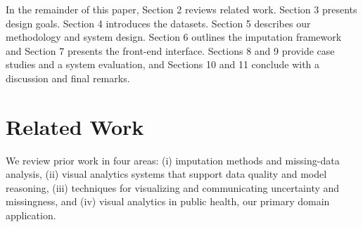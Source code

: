 \documentclass[review]{vgtc}
\newcommand{\gknn}{gKNN\xspace}
\newcommand{\mice}{MICE\xspace}
\begin{document}

In the remainder of this paper, Section 2 reviews related work. Section 3 presents design goals. Section 4 introduces the datasets. Section 5 describes our methodology and system design. Section 6 outlines the imputation framework and Section 7 presents the front-end interface. Sections 8 and 9 provide case studies and a system evaluation, and Sections 10 and 11 conclude with a discussion and final remarks.

\section{Related Work}
\label{sec:related}
We review prior work in four areas: (i) imputation methods and missing-data analysis, (ii) visual analytics systems that support data quality and model reasoning, (iii) techniques for visualizing and communicating uncertainty and missingness, and (iv) visual analytics in public health, our primary domain application.
\end{document}
